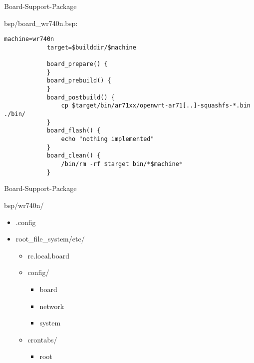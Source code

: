\begin{frame}[fragile]{Board-Support-Package}
    \begin{block}{bsp/board\_wr740n.bsp:}
        \scriptsize
        \begin{lstlisting}[gobble=12]
            machine=wr740n
            target=$builddir/$machine

            board_prepare() {
            }
            board_prebuild() {
            }
            board_postbuild() {
                cp $target/bin/ar71xx/openwrt-ar71[..]-squashfs-*.bin ./bin/
            }
            board_flash() {
                echo "nothing implemented"
            }
            board_clean() {
                /bin/rm -rf $target bin/*$machine*
            }
        \end{lstlisting}
    \end{block}
\end{frame}

\begin{frame}{Board-Support-Package}
    \begin{block}{bsp/wr740n/}
        \begin{itemize}
            \item .config
            \item root\_file\_system/etc/
            \begin{itemize}
                \item rc.local.board
                \item config/
                \begin{itemize}
                    \item board
                    \item network
                    \item system
                \end{itemize}
                \item crontabs/
                \begin{itemize}
                    \item root
                \end{itemize}
            \end{itemize}
        \end{itemize}
    \end{block}
\end{frame}

